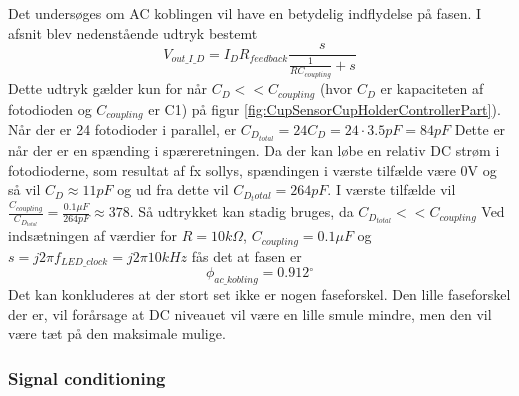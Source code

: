 \documentclass[HardwareDesign/HardwareDesign_main.tex]{subfiles}
\begin{document}
Det undersøges om AC koblingen vil have en betydelig indflydelse på fasen. I afsnit  blev nedenstående udtryk bestemt
$$V_{out\_I\_D} = I_D R_{feedback} \frac{s}{\frac{1}{R C_{coupling}} + s}$$
Dette udtryk gælder kun for når $C_D << C_{coupling}$ (hvor $C_D$ er kapaciteten af fotodioden og $C_{coupling}$ er C1) på figur \ref{fig:CupSensorCupHolderControllerPart}). Når der er 24 fotodioder i parallel, er $C_{D_{total}} = 24C_D =  24\cdot 3.5\si{pF} = 84\si{pF}$ Dette er når der er en spænding i spæreretningen. Da der kan løbe en relativ DC strøm i fotodioderne, som resultat af fx sollys, spændingen i værste tilfælde være 0V og så vil $C_D \approx 11\si{pF}$ og ud fra dette vil $C_{D_total} = 264\si{pF}$. I værste tilfælde vil $\frac{C_{coupling}}{C_{D_{total}}} = \frac{0.1\si{\mu F}}{264\si{pF}} \approx 378$. Så udtrykket kan stadig bruges, da $C_{D_{total}} << C_{coupling}$
Ved indsætningen af værdier for $R=10k\Omega$, $C_{coupling} = 0.1 \si{\mu F}$ og $s=j2\pi f_{LED\_clock} = j2\pi 10 \si{kHz}$ fås det at fasen er 
$$\phi_{ac\_kobling} = 0.912\si{^{\circ}}$$
Det kan konkluderes at der stort set ikke er nogen faseforskel. Den lille faseforskel der er, vil forårsage at DC niveauet vil være en lille smule mindre, men den vil være tæt på den maksimale mulige. 

\subsubsection{Signal conditioning}
\end{document}
